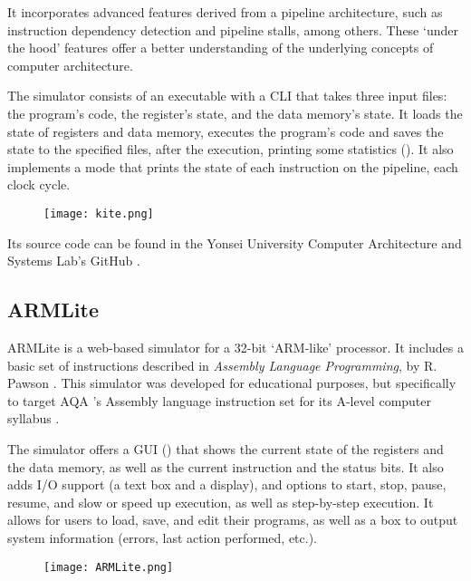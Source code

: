 It incorporates advanced features derived from a \gls{pipeline} architecture, such as \gls{instruction dependency} detection and \gls{pipeline stalls}, among others. These `under the hood' features offer a better understanding of the underlying concepts of computer architecture.

The simulator consists of an executable with a \gls{CLI} that takes three input files: the program's code, the register's state, and the data \gls{memory}'s state. It loads the state of registers and data \gls{memory}, executes the program's code and saves the state to the specified files, after the execution, printing some statistics (). It also implements a  mode that prints the state of each instruction on the \gls{pipeline}, each \gls{clock cycle}.

\begin{figure}[htb]
    {\texttt{[image: kite.png]}}
\end{figure}

Its source code can be found in the Yonsei University Computer Architecture and Systems Lab's GitHub \parencite{kiteGH}.


\subsection*{ARMLite}\label{subsubsec:armlite}
ARMLite \parencite{ARMLite} is a web-based simulator for a 32-bit `ARM-like' processor. It includes a basic set of instructions described in \textit{Assembly Language Programming}, by R. Pawson \parencite{PawsonRichard.2020Ass}. This simulator was developed for educational purposes, but specifically to target AQA \parencite{AQA}'s Assembly language instruction set for its A-level computer syllabus \parencite{AQAInstructionSet}.

The simulator offers a \gls{GUI} () that shows the current state of the \glspl{register} and the data \gls{memory}, as well as the current instruction and the status bits. It also adds \gls{I/O} support (a text box and a display), and options to start, stop, pause, resume, and slow or speed up execution, as well as step-by-step execution. It allows for users to load, save, and edit their programs, as well as a box to output system information (errors, last action performed, etc.).

\begin{figure}[htb]
    {\texttt{[image: ARMLite.png]}}
\end{figure}

